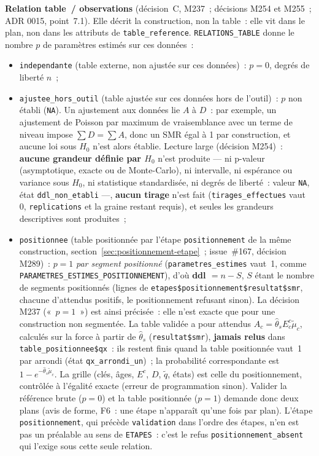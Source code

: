 \documentclass[a4paper,11pt]{article}
\newcommand{\code}[1]{\texttt{\small #1}}
\begin{document}
\medskip
\textbf{Relation table~/ observations} (décision~C, M237~; décisions M254
et M255~; ADR 0015, point~7.1). Elle décrit la construction, non la
table~: elle vit dans le plan, non dans les attributs de
\code{table\_reference}. \code{RELATIONS\_TABLE} donne le nombre $p$ de
paramètres estimés sur ces données~:
\begin{itemize}[leftmargin=*, itemsep=2pt]
  \item \code{independante} (table externe, non ajustée sur ces données)~:
    $p = 0$, degrés de liberté $n$~;
  \item \code{ajustee\_hors\_outil} (table ajustée sur ces données hors de
    l'outil)~: $p$ non établi (\code{NA}). Un ajustement aux données lie
    $A$ à $D$~: par exemple, un ajustement de Poisson par maximum de
    vraisemblance avec un terme de niveau impose $\sum D = \sum A$, donc un
    SMR égal à 1 par construction, et aucune loi sous $H_0$ n'est alors
    établie. Lecture large (décision M254)~: \textbf{aucune grandeur définie
    par $H_0$} n'est produite --- ni p-valeur (asymptotique, exacte ou de
    Monte-Carlo), ni intervalle, ni espérance ou variance sous $H_0$, ni
    statistique standardisée, ni degrés de liberté~: valeur \code{NA}, état
    \code{ddl\_non\_etabli} ---, \textbf{aucun tirage} n'est fait
    (\code{tirages\_effectues} vaut 0, \code{replications} et la graine
    restant requis), et seules les grandeurs descriptives sont produites~;
  \item \code{positionnee} (table positionnée par l'étape
    \code{positionnement} de la même construction, section~\ref{sec:positionnement-etape}~;
    issue~\#167, décision M289)~: $p = 1$ \emph{par segment positionné}
    (\code{parametres\_estimes} vaut~1, comme
    \code{PARAMETRES\_ESTIMES\_POSITIONNEMENT}), d'où
    \textbf{ddl $= n - S$}, $S$ étant le nombre de segments positionnés
    (lignes de \code{etapes\$positionnement\$resultat\$smr}, chacune
    d'attendus positifs, le positionnement refusant sinon). La décision
    M237 («~$p = 1$~») est ainsi précisée~: elle n'est exacte que pour une
    construction non segmentée. La table validée a pour attendus $A_c =
    \hat\theta_s E^c_c \tilde\mu_c$, calculés sur la force à partir de
    $\hat\theta_s$ (\code{resultat\$smr}), \textbf{jamais relus} dans
    \code{table\_positionnee\$qx}~: ils restent finis quand la table
    positionnée vaut~1 par arrondi (état \code{qx\_arrondi\_un})~; la
    probabilité correspondante est $1 - e^{-\hat\theta_s \tilde\mu_c}$. La
    grille (clés, âges, $E^c$, $D$, $\tilde q$, états) est celle du
    positionnement, contrôlée à l'égalité exacte (erreur de programmation
    sinon). Valider la référence brute ($p = 0$) et la table positionnée
    ($p = 1$) demande donc deux plans (avis de forme, F6~: une étape
    n'apparaît qu'une fois par plan). L'étape \code{positionnement}, qui
    précède \code{validation} dans l'ordre des étapes, n'en est pas un
    préalable au sens de \code{ETAPES}~: c'est le refus
    \code{positionnement\_absent} qui l'exige sous cette seule relation.
\end{itemize}
\end{document}
